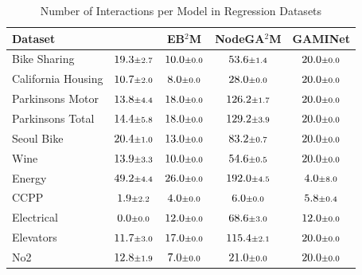 \begin{table}[t]
  \centering
  \caption{Number of Interactions per Model in Regression Datasets}
  \label{tab:regression_interactions}
    \begin{tabular}{lcccc}
      \toprule
      \textbf{Dataset} & \textbf{\method{}} & \textbf{EB$^2$M} & \textbf{NodeGA$^2$M} & \textbf{GAMINet} \\
      \midrule
        Bike Sharing & $19.3 \text{\scriptsize$\pm$2.7}$ & $10.0 \text{\scriptsize$\pm$0.0}$ & $53.6 \text{\scriptsize$\pm$1.4}$ & $20.0 \text{\scriptsize$\pm$0.0}$ \\
        California Housing & $10.7 \text{\scriptsize$\pm$2.0}$ & $8.0 \text{\scriptsize$\pm$0.0}$ & $28.0 \text{\scriptsize$\pm$0.0}$ & $20.0 \text{\scriptsize$\pm$0.0}$ \\
        Parkinsons Motor & $13.8 \text{\scriptsize$\pm$4.4}$ & $18.0 \text{\scriptsize$\pm$0.0}$ & $126.2 \text{\scriptsize$\pm$1.7}$ & $20.0 \text{\scriptsize$\pm$0.0}$ \\
        Parkinsons Total & $14.4 \text{\scriptsize$\pm$5.8}$ & $18.0 \text{\scriptsize$\pm$0.0}$ & $129.2 \text{\scriptsize$\pm$3.9}$ & $20.0 \text{\scriptsize$\pm$0.0}$ \\
        Seoul Bike & $20.4 \text{\scriptsize$\pm$1.0}$ & $13.0 \text{\scriptsize$\pm$0.0}$ & $83.2 \text{\scriptsize$\pm$0.7}$ & $20.0 \text{\scriptsize$\pm$0.0}$ \\
        Wine & $13.9 \text{\scriptsize$\pm$3.3}$ & $10.0 \text{\scriptsize$\pm$0.0}$ & $54.6 \text{\scriptsize$\pm$0.5}$ & $20.0 \text{\scriptsize$\pm$0.0}$ \\
        Energy & $49.2 \text{\scriptsize$\pm$4.4}$ & $26.0 \text{\scriptsize$\pm$0.0}$ & $192.0 \text{\scriptsize$\pm$4.5}$ & $4.0 \text{\scriptsize$\pm$8.0}$ \\
        CCPP & $1.9 \text{\scriptsize$\pm$2.2}$ & $4.0 \text{\scriptsize$\pm$0.0}$ & $6.0 \text{\scriptsize$\pm$0.0}$ & $5.8 \text{\scriptsize$\pm$0.4}$ \\
        Electrical & $0.0 \text{\scriptsize$\pm$0.0}$ & $12.0 \text{\scriptsize$\pm$0.0}$ & $68.6 \text{\scriptsize$\pm$3.0}$ & $12.0 \text{\scriptsize$\pm$0.0}$ \\
        Elevators & $11.7 \text{\scriptsize$\pm$3.0}$ & $17.0 \text{\scriptsize$\pm$0.0}$ & $115.4 \text{\scriptsize$\pm$2.1}$ & $20.0 \text{\scriptsize$\pm$0.0}$ \\
        No2 & $12.8 \text{\scriptsize$\pm$1.9}$ & $7.0 \text{\scriptsize$\pm$0.0}$ & $21.0 \text{\scriptsize$\pm$0.0}$ & $20.0 \text{\scriptsize$\pm$0.0}$ \\

\end{tabular}
\end{table}
